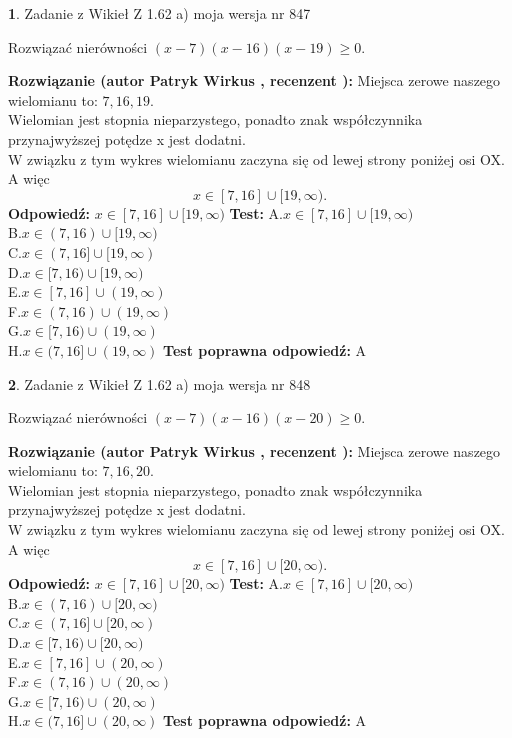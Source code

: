 \documentclass[12pt, a4paper]{article}
\theoremstyle{definition} %
\newtheorem{zad}{}
\newcommand{\zadStart}[1]{\begin{zad}#1\newline}
\newcommand{\zadStop}{\end{zad}}
\newcommand{\rozwStart}[2]{\noindent \textbf{Rozwiązanie (autor #1 , recenzent #2): }\newline}
\newcommand{\rozwStop}{\newline}
\newcommand{\odpStart}{\noindent \textbf{Odpowiedź:}\newline}
\newcommand{\odpStop}{\newline}
\newcommand{\testStart}{\noindent \textbf{Test:}\newline}
\newcommand{\testStop}{\newline}
\newcommand{\kluczStart}{\noindent \textbf{Test poprawna odpowiedź:}\newline}
\newcommand{\kluczStop}{\newline}
\begin{document}
\zadStart{Zadanie z Wikieł Z 1.62 a) moja wersja nr 847}

Rozwiązać nierówności $(x-7)(x-16)(x-19)\ge0$.
\zadStop
\rozwStart{Patryk Wirkus}{}
Miejsca zerowe naszego wielomianu to: $7, 16, 19$.\\
Wielomian jest stopnia nieparzystego, ponadto znak współczynnika przy\linebreak najwyższej potędze x jest dodatni.\\ W związku z tym wykres wielomianu zaczyna się od lewej strony poniżej osi OX. A więc $$x \in [7,16] \cup [19,\infty).$$
\rozwStop
\odpStart
$x \in [7,16] \cup [19,\infty)$
\odpStop
\testStart
A.$x \in [7,16] \cup [19,\infty)$\\
B.$x \in (7,16) \cup [19,\infty)$\\
C.$x \in (7,16] \cup [19,\infty)$\\
D.$x \in [7,16) \cup [19,\infty)$\\
E.$x \in [7,16] \cup (19,\infty)$\\
F.$x \in (7,16) \cup (19,\infty)$\\
G.$x \in [7,16) \cup (19,\infty)$\\
H.$x \in (7,16] \cup (19,\infty)$
\testStop
\kluczStart
A
\kluczStop



\zadStart{Zadanie z Wikieł Z 1.62 a) moja wersja nr 848}

Rozwiązać nierówności $(x-7)(x-16)(x-20)\ge0$.
\zadStop
\rozwStart{Patryk Wirkus}{}
Miejsca zerowe naszego wielomianu to: $7, 16, 20$.\\
Wielomian jest stopnia nieparzystego, ponadto znak współczynnika przy\linebreak najwyższej potędze x jest dodatni.\\ W związku z tym wykres wielomianu zaczyna się od lewej strony poniżej osi OX. A więc $$x \in [7,16] \cup [20,\infty).$$
\rozwStop
\odpStart
$x \in [7,16] \cup [20,\infty)$
\odpStop
\testStart
A.$x \in [7,16] \cup [20,\infty)$\\
B.$x \in (7,16) \cup [20,\infty)$\\
C.$x \in (7,16] \cup [20,\infty)$\\
D.$x \in [7,16) \cup [20,\infty)$\\
E.$x \in [7,16] \cup (20,\infty)$\\
F.$x \in (7,16) \cup (20,\infty)$\\
G.$x \in [7,16) \cup (20,\infty)$\\
H.$x \in (7,16] \cup (20,\infty)$
\testStop
\kluczStart
A
\kluczStop
\end{document}
